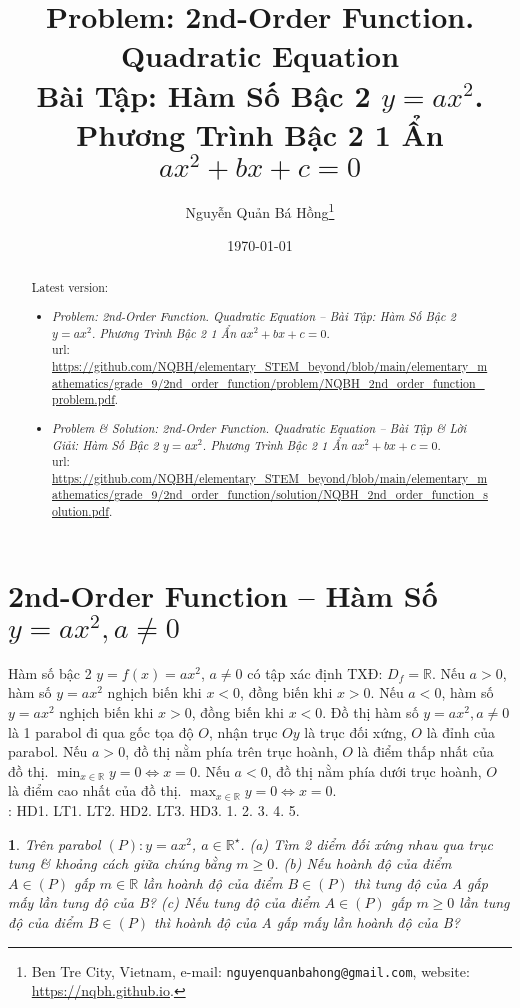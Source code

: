 \documentclass{article}
\title{Problem: 2nd-Order Function. Quadratic Equation\\Bài Tập: Hàm Số Bậc 2 $y = ax^2$. Phương Trình Bậc 2 1 Ẩn $ax^2 + bx + c = 0$}
\author{Nguyễn Quản Bá Hồng\footnote{Ben Tre City, Vietnam, e-mail: \texttt{nguyenquanbahong@gmail.com}, website: \url{https://nqbh.github.io}.}}
\date{\today}
\newtheorem{baitoan}{}
\begin{document}
\maketitle
\begin{abstract}
	Latest version:
	\begin{itemize}
		\item \textit{Problem: 2nd-Order Function. Quadratic Equation -- Bài Tập: Hàm Số Bậc 2 $y = ax^2$. Phương Trình Bậc 2 1 Ẩn $ax^2 + bx + c = 0$}.\\{\sc url}: \url{https://github.com/NQBH/elementary_STEM_beyond/blob/main/elementary_mathematics/grade_9/2nd_order_function/problem/NQBH_2nd_order_function_problem.pdf}.
		\item \textit{Problem \& Solution: 2nd-Order Function. Quadratic Equation -- Bài Tập \& Lời Giải: Hàm Số Bậc 2 $y = ax^2$. Phương Trình Bậc 2 1 Ẩn $ax^2 + bx + c = 0$}.\\{\sc url}: \url{https://github.com/NQBH/elementary_STEM_beyond/blob/main/elementary_mathematics/grade_9/2nd_order_function/solution/NQBH_2nd_order_function_solution.pdf}.
	\end{itemize}
\end{abstract}
\tableofcontents


\section{2nd-Order Function -- Hàm Số $y = ax^2,a\ne0$}
 Hàm số bậc 2 $y = f(x) = ax^2$, $a\ne0$ có tập xác định TXĐ: $D_f = \mathbb{R}$. Nếu $a > 0$, hàm số $y = ax^2$ nghịch biến khi $x < 0$, đồng biến khi $x > 0$. Nếu $a < 0$, hàm số $y = ax^2$ nghịch biến khi $x > 0$, đồng biến khi $x < 0$.  Đồ thị hàm số $y = ax^2,a\ne0$ là 1 parabol đi qua gốc tọa độ $O$, nhận trục $Oy$ là trục đối xứng, $O$ là đỉnh của parabol. Nếu $a > 0$, đồ thị nằm phía trên trục hoành, $O$ là điểm thấp nhất của đồ thị. $\min_{x\in\mathbb{R}} y = 0\Leftrightarrow x = 0$. Nếu $a < 0$, đồ thị nằm phía dưới trục hoành, $O$ là điểm cao nhất của đồ thị. $\max_{x\in\mathbb{R}} y = 0\Leftrightarrow x = 0$.\\

\noindent\cite[Chap. VII, \S1, pp. 46--51]{SGK_Toan_9_Canh_Dieu_tap_2}: HD1. LT1. LT2. HD2. LT3. HD3. 1. 2. 3. 4. 5.

\begin{baitoan}
	Trên parabol $(P):y = ax^2$, $a\in\mathbb{R}^\star$. (a) Tìm 2 diểm đối xứng nhau qua trục tung \& khoảng cách giữa chúng bằng $m\ge0$. (b) Nếu hoành độ của điểm $A\in(P)$ gấp $m\in\mathbb{R}$ lần hoành độ của điểm $B\in(P)$ thì tung độ của A gấp mấy lần tung độ của B? (c) Nếu tung độ của điểm $A\in(P)$ gấp $m\ge0$ lần tung độ của điểm $B\in(P)$ thì hoành độ của A gấp mấy lần hoành độ của B?
\end{baitoan}
\end{document}
